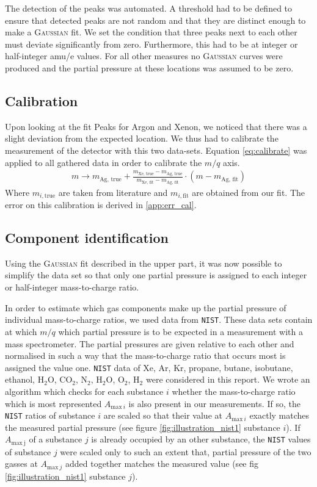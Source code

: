 The detection of the peaks was automated. A threshold had to be defined to ensure that detected peaks are not random and that they are distinct enough to make a {\scshape Gaussian} fit. We set the condition that three peaks next to each other must deviate significantly from zero. Furthermore, this had to be at integer or half-integer amu/e values. 
For all other measures no {\scshape Gaussian} curves were produced and the partial pressure at these locations was assumed to be zero.

\subsection{Calibration}
Upon looking at the fit Peaks for Argon and Xenon, we noticed that there was a slight deviation from the expected location. We thus had to calibrate the measurement of the detector with this two data-sets. Equation \eqref{eq:calibrate} was applied to all gathered data in order to calibrate the $m/q$ axis.
\begin{align}
    m \to m_\text{Ag, true} + \frac{m_\text{Xe, true} - m_\text{Ag, true}}{m_\text{Xe, fit} - m_\text{Ag, fit}} \cdot (m - m_\text{Ag, fit}) \label{eq:calibrate}
\end{align}
Where $m_{i, \text{true}}$ are taken from literature and $m_{i, \text{fit}}$ are obtained from our fit.
The error on this calibration is derived in \ref{app:err_cal}.

\subsection{Component identification}

Using the {\scshape Gaussian} fit described in the upper part, it was now possible to simplify the data set so that only one partial pressure is assigned to each integer or half-integer mass-to-charge ratio. 

In order to estimate which gas components make up the partial pressure of individual mass-to-charge ratios, we used data from \texttt{NIST}. These data sets contain at which $m/q$ which partial pressure is to be expected in a measurement with a mass spectrometer. The partial pressures are given relative to each other and normalised in such a way that the mass-to-charge ratio that occurs most is assigned the value one. \texttt{NIST} data of Xe, Ar, Kr, propane, butane, isobutane, ethanol, H$_2$O, CO$_2$, N$_2$, H$_2$O, O$_2$, H$_2$ were considered in this report. We wrote an algorithm which checks for each substance $i$ whether the mass-to-charge ratio which is most represented $A_{\mathrm{max}~i}$ is also present in our measurements. If so, the \texttt{NIST} ratios of substance $i$ are scaled so that their value at $A_{\mathrm{max}~i}$ exactly matches the measured partial pressure (see figure \ref{fig:illustration_nist1} substance $i$). If $A_{\mathrm{max~j}}$ of a substance $j$ is already occupied by an other substance, the \texttt{NIST} values of substance $j$ were scaled only to such an extent that, partial pressure of the two gasses at $A_{\mathrm{max}~j}$ added together matches the measured value (see fig \ref{fig:illustration_nist1} substance $j$).  

